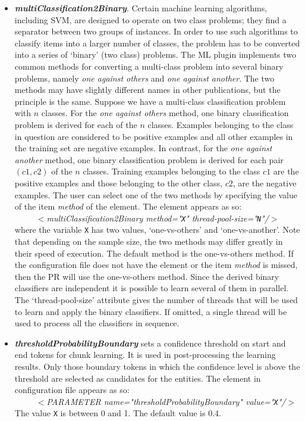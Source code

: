 \begin{itemize}
\item {\em {\bf multiClassification2Binary}}. Certain machine learning
algorithms, including SVM, are designed to operate on two class problems; they
find a separator between two groups of instances. In order to use such algorithms
to classify items into a larger number of classes, the problem has to be
converted into a series of `binary' (two class) problems. The ML plugin
implements two common methods for converting a multi-class problem into several
binary problems, namely {\em one against others} and {\em one against another}.
The two methods may have slightly different names in other publications, but the
principle is the same. Suppose we have a multi-class classification problem with
$n$ classes. For the {\em one against others} method, one binary classification
problem is derived for each of the $n$ classes. Examples belonging to the class
in question are considered to be positive examples and all other examples in the
training set are negative examples. In contrast, for the {\em one against
another} method, one binary classification problem is derived for each pair $(c1,
c2)$ of the $n$ classes. Training examples belonging to the class $c1$ are the
positive examples and those belonging to the other class, $c2$, are the negative
examples. The user can select one of the two methods by specifying the value of
the item {\em method} of the
element.  The element appears as so:\\
\ \ \ \ \  {\em $<$multiClassification2Binary method="\texttt{X}" thread-pool-size="\texttt{N}"/$>$}\\
 where the variable \texttt{X} has two values, `one-vs-others' and
`one-vs-another'. Note that depending on the sample size, the two methods may
differ greatly in their speed of execution. The default method is the
one-vs-others method. If the configuration file does not have the element or the
item {\em method} is missed, then the PR will use the one-vs-others method. Since
the derived binary classifiers are independent it is possible to learn several of
them in parallel. The `thread-pool-size' attribute gives the number of threads
that will be used to learn and apply the binary classifiers. If omitted, a single
thread will be used to process all the classifiers in sequence.

\item {\em {\bf thresholdProbabilityBoundary}} sets a confidence threshold on
start and end tokens for chunk learning. It is used in post-processing the learning
results. Only those boundary tokens in which the confidence level is above the
threshold are selected as candidates for
the entities. The element in configuration file appears as so:\\
\ \ \ \ \ {\em $<$PARAMETER name="thresholdProbabilityBoundary" value="\texttt{X}"/$>$}\\
The value \texttt{X} is between 0 and 1. The default value is  0.4.


\end{itemize}
